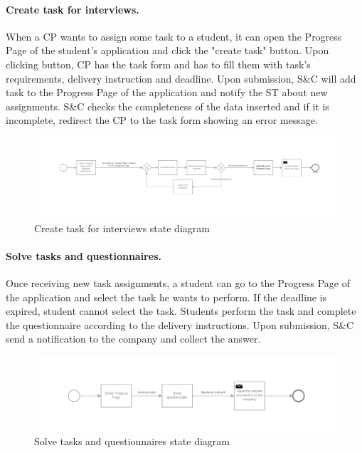 \paragraph{Create task for interviews.}
When a CP wants to assign some task to a student, it can open the Progress Page of the student's application and click the "create task" button.
Upon clicking button, CP has the task form and has to fill them with task's requirements, delivery instruction and deadline.
Upon submission, S\&C will add task to the Progress Page of the application and notify the ST about new assignments.
S\&C checks the completeness of the data inserted and if it is incomplete, redirect the CP to the task form showing an error message.

\begin{figure}[H]
    \begin{center}
        \includegraphics[width=1\linewidth]{RASD/LaTeX/Images/StateDiagrams/create_task_for_interviews.png}
        \caption{Create task for interviews state diagram}
        \label{fig:create_task_for_interviews_sd}%
    \end{center}
\end{figure}

\paragraph{Solve tasks and questionnaires.}
Once receiving new task assignments, a student can go to the Progress Page of the application and select the task he wants to perform. If the deadline is expired, student cannot select the task.
Students perform the task and complete the questionnaire according to the delivery instructions.
Upon submission, S\&C send a notification to the company and collect the answer.

\begin{figure}[H]
    \begin{center}
        \includegraphics[width=1\linewidth]{RASD/LaTeX/Images/StateDiagrams/solve_tasks_and_questionnaires.png}
        \caption{Solve tasks and questionnaires state diagram}
        \label{fig:solve_tasks_and_questionnaires_sd}%
    \end{center}
\end{figure}

